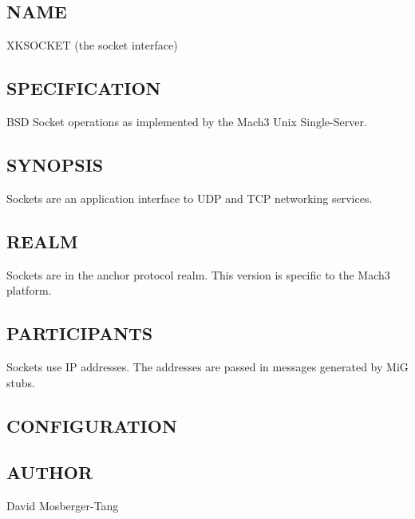 %
%
%

\subsection*{NAME}

\noindent XKSOCKET (the \xk{} socket interface)

\subsection*{SPECIFICATION}

\noindent BSD Socket operations as implemented by the Mach3 Unix Single-Server.

\subsection*{SYNOPSIS}

\noindent Sockets are an application interface to UDP and TCP networking
services.

\subsection*{REALM}

Sockets are in the anchor protocol realm.  This version is specific
to the Mach3 platform.

\subsection*{PARTICIPANTS}

Sockets use IP addresses.  The addresses are passed in messages generated
by MiG stubs.


\subsection*{CONFIGURATION}


\subsection*{AUTHOR}

\noindent David Mosberger-Tang
